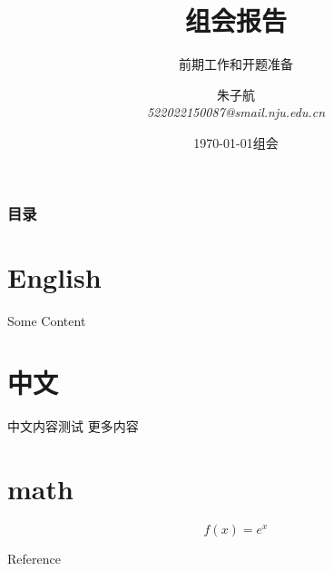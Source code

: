 \documentclass{si_template/cn_pre}
\title[组会报告]{ 组会报告 }
\subtitle{ 前期工作和开题准备 }
\author[朱子航]{\texorpdfstring{朱子航 \\ \smallskip \textit{522022150087@smail.nju.edu.cn}}{}}
\date[\today]{\texorpdfstring{\today 组会}{}}
\begin{document}
\begin{frame}
    \titlepage
\end{frame}
\begin{frame}
    \frametitle{目录}
    \tableofcontents
\end{frame}

\section{English}
\begin{frame}
    Some Content \cite{arjovskyWassersteinGAN2017}
\end{frame}

\section{中文}
\begin{frame}
    中文内容测试 \pause 更多内容
\end{frame}

\section{math}
\begin{frame}
    $$f(x)=e^x$$
\end{frame}

\begin{frame}[allowframebreaks]{Reference}
    
    
\end{frame}
\end{document}
